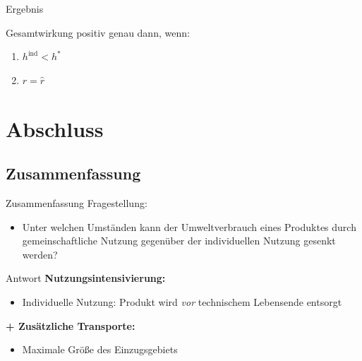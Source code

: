 \documentclass[beamer, xcolor={table,usenames,dvipsnames}]{beamer}
\begin{document}
    \begin{frame}{Ergebnis}
    	\begin{block}{}
            Gesamtwirkung positiv genau dann, wenn:
    		\begin{enumerate}
 			    \item $h^\text{ind} < h^* $
 			    \item $r = \hat{r}$
    		\end{enumerate}
    	\end{block}
    \end{frame}    

    \section{Abschluss}
    \subsection{Zusammenfassung}
	\begin{frame}{Zusammenfassung}
		\pause
		Fragestellung:
		\begin{itemize}
			\item Unter welchen Umständen kann der Umweltverbrauch eines Produktes durch gemeinschaftliche Nutzung gegenüber der individuellen Nutzung gesenkt werden?
		\end{itemize}
		\pause
		\begin{block}{Antwort}
			\textbf{Nutzungsintensivierung:}
			\begin{itemize}
				\item Individuelle Nutzung: Produkt wird \emph{vor} technischem Lebensende entsorgt  
			\end{itemize}
			\pause
			\textbf{+ Zusätzliche Transporte:}
			\begin{itemize}
				\item Maximale Größe des Einzugsgebiets
			\end{itemize}
		\end{block}
	\end{frame}
\end{document}
